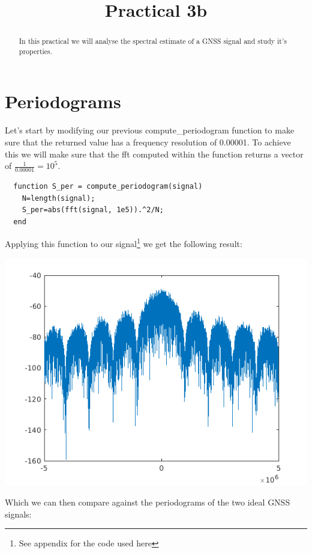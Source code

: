 \documentclass[conference,9pt]{IEEEtran}
\begin{document}
\title{Practical 3b}

\author{
}


\maketitle
\begin{abstract}
In this practical we will analyse the spectral estimate of a GNSS signal and study it's properties.
\end{abstract}

\section{Periodograms}
Let's start by modifying our previous compute\_periodogram function to make sure that the returned value has a frequency resolution of 0.00001. To achieve this we will make sure that the fft computed within the function returns a vector of $\frac{1}{0.00001}=10^5$.

\begin{verbatim}
  function S_per = compute_periodogram(signal)
    N=length(signal);
    S_per=abs(fft(signal, 1e5)).^2/N;
  end
\end{verbatim}

Applying this function to our signal\footnote{See appendix for the code used here} we get the following result:

\includegraphics[scale=0.5]{b1}

Which we can then compare against the periodograms of the two ideal GNSS signals:
\end{document}
